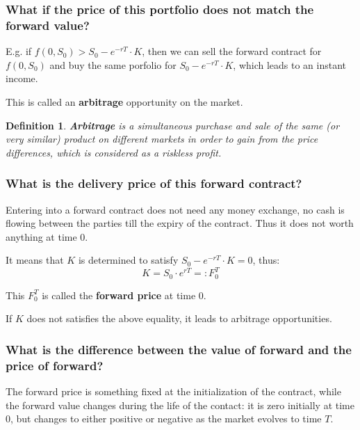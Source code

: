 \documentclass[ignorenonframetext, 9pt]{beamer}
\newtheorem{de}{Definition}
\begin{document}
\begin{frame}
\frametitle{What if the price of this portfolio does not match the forward value?}

E.g. if $f(0, S_0) > S_0 - e^{-rT} \cdot K$, then we can sell the forward contract for $f(0, S_0)$ and buy the same porfolio for $S_0 - e^{-rT} \cdot K$, which leads to an instant income. \newline

\pause

This is called an \textbf{arbitrage} opportunity on the market. \newline

\begin{de}
\textbf{Arbitrage} is a simultaneous purchase and sale of the same (or very similar) product on different markets in order to gain from the price differences, which is considered as a riskless profit.
\end{de}


\end{frame}

\begin{frame}
\frametitle{What is the delivery price of this forward contract?}

Entering into a forward contract does not need any money exchange, no cash is flowing between the parties till the expiry of the contract. Thus it does not worth anything at time 0. \newline

\pause

It means that $K$ is determined to satisfy $S_0 - e^{-rT} \cdot K = 0$, thus:
\begin{equation}
K = S_0 \cdot e^{rT} =: F_0^T
\end{equation} \newline

\pause

This $F_0^T$ is called the \textbf{forward price} at time $0$. \newline


If $K$ does not satisfies the above equality, it leads to arbitrage opportunities. \newline

\end{frame}

\begin{frame}
\frametitle{What is the difference between the value of forward and the price of forward?}

The forward price is something fixed at the initialization of the contract, while the forward value changes during the life of the contact: it is zero initially at time $0$, but changes to either positive or negative as the market evolves to time $T$. 

\end{frame}
\end{document}
